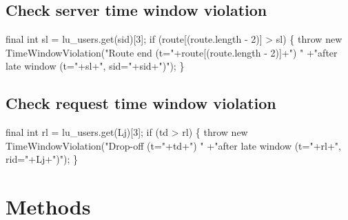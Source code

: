\subsection{Check server time window violation}
\nwenddocs{}\endmoddef{}
final int sl = lu_users.get(sid)[3];
if (route[(route.length - 2)] > sl) \{
  throw new TimeWindowViolation("Route end (t="+route[(route.length - 2)]+") "
      +"after late window (t="+sl+", sid="+sid+")");
\}
\nwendcode{}\nwdocspar

\subsection{Check request time window violation}
\nwenddocs{}\endmoddef{}
final int rl = lu_users.get(Lj)[3];
if (td > rl) \{
  throw new TimeWindowViolation("Drop-off (t="+td+") "
      +"after late window (t="+rl+", rid="+Lj+")");
\}
\nwendcode{}\nwdocspar

\section{Methods}

